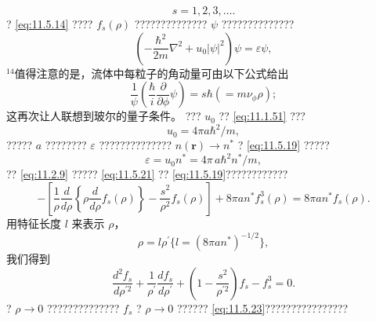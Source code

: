 \begin{equation}\tag{11.5.18}\label{eq:11.5.18}
s = 1 , 2 , 3 , \ldots .
\end{equation}
? \autoref{eq:11.5.14} ???? \(f_{s}(\rho)\) ?????????????? \(\psi\) ??????????????
\begin{equation}\tag{11.5.19}\label{eq:11.5.19}
\left( - \frac { \hbar ^{2} } { 2 m } \nabla ^{2} + u _ { 0 } | \psi | ^{2} \right) \psi = \varepsilon \psi ,
\end{equation}
\(^{14}\)值得注意的是，流体中每粒子的角动量可由以下公式给出
\begin{equation}\tag{11.5.20}\label{eq:11.5.20}
\frac { 1 } { \psi } \left( \frac { \hbar } { i } \frac { \partial } { \partial \phi } \psi \right) = s \hbar ( = m \nu _ { \phi } \rho ) ;
\end{equation}
这再次让人联想到玻尔的量子条件。
??? \(u_{0}\) ?? \autoref{eq:11.1.51} ???
\begin{equation}\tag{11.5.21}\label{eq:11.5.21}
u _ { 0 } = 4 \pi a \hbar ^{2} / m ,
\end{equation}
????? \(a\) ???????? \(\varepsilon\) ?????????????? \(n(\mathbf{r}) \rightarrow n^{*}\) ? \autoref{eq:11.5.19} ?????
\begin{equation}\tag{11.5.22}\label{eq:11.5.22}
\varepsilon = u _ { 0 } n ^{*} = 4 \pi \, a \hbar ^{2} n ^{*} / m ,
\end{equation}
?? \autoref{eq:11.2.9} ????? \autoref{eq:11.5.21} ?? \autoref{eq:11.5.19}????????????
\begin{equation}\tag{11.5.23}\label{eq:11.5.23}
- \left[ \frac { 1 } { \rho } \frac { d } { d \rho } \left\{ \rho \frac { d } { d \rho } f _ { s } ( \rho ) \right\} - \frac { s ^{2} } { \rho ^{2} } f _ { s } ( \rho ) \right] + 8 \pi a n ^{*} f _ { s } ^{3} ( \rho ) = 8 \pi a n ^{*} f _ { s } ( \rho ) .
\end{equation}
用特征长度 \(l\) 来表示 \(\rho\)，
\begin{equation}\tag{11.5.24}\label{eq:11.5.24}
\rho = l \rho ^{\prime}  \{ l = ( 8 \pi a n ^{*} ) ^{- 1 / 2} \} ,
\end{equation}
我们得到
\begin{equation}\tag{11.5.25}\label{eq:11.5.25}
\frac { d ^{2} f _ { s } } { d \rho ^{\prime 2} } + \frac { 1 } { \rho ^{\prime} } \frac { d f _ { s } } { d \rho ^{\prime} } + \left( 1 - \frac { s ^{2} } { \rho ^{\prime 2} } \right) f _ { s } - f _ { s } ^{3} = 0 .
\end{equation}
? \(\rho \to 0\) ?????????????? \(f_s\) ? \(\rho \to 0\) ?????? \autoref{eq:11.5.23}????????????????
